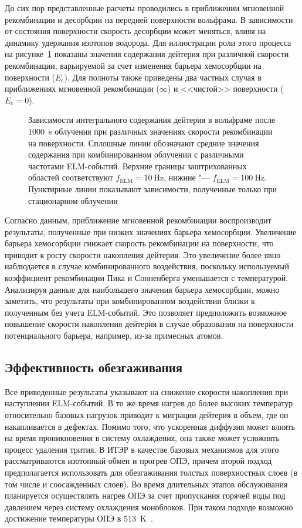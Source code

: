 До сих пор представленные расчеты проводились в приближении мгновенной рекомбинации и десорбции на передней поверхности вольфрама. В зависимости от состояния поверхности скорость десорбции может меняться, влияя на динамику удержания изотопов водорода. Для иллюстрации роли этого процесса на рисунке~\cref{fig:ch3/rec_var} показаны значения содержания дейтерия при различной скорости рекомбинации, варьируемой за счет изменения барьера хемосорбции на поверхности ($E_{\mathrm{c}}$). Для полноты также приведены два частных случая в приближениях мгновенной рекомбинации ($\infty$) и <<чистой>> поверхности ($E_{\mathrm{c}}=0$).

\begin{figure}[ht]
	\caption{Зависимости интегрального содержания дейтерия в вольфраме после \SI{1000}{\second} облучения при различных значениях скорости рекомбинации на поверхности. Сплошные линии обозначают средние значения содержания при комбинированном облучении с различными частотами ELM-событий. Верхние границы заштрихованных областей соответствуют \(f_\mathrm{ELM} = \SI{10}{\hertz}\), нижние "--- \(f_\mathrm{ELM} = \SI{100}{\hertz}\). Пунктирные линии показывают зависимости, полученные только при стационарном облучении}\label{fig:ch3/rec_var}
\end{figure}

Согласно данным, приближение мгновенной рекомбинации воспроизводит результаты, полученные при низких значениях барьера хемосорбции. Увеличение барьера хемосорбции снижает скорость рекомбинации на поверхности, что приводит к росту скорости накопления дейтерия. Это увеличение более явно наблюдается в случае комбинированного воздействия, поскольку используемый коэффициент рекомбинации Пика и Сонненберга уменьшается с температурой. Анализируя данные для наибольшего значения барьера хемосорбции, можно заметить, что результаты при комбинированном воздействии близки к полученным без учета ELM-событий. Это позволяет предположить возможное повышение скорости накопления дейтерия в случае образования на поверхности потенциального барьера, например, из-за примесных атомов.

\subsection{Эффективность обезгаживания}

Все приведенные результаты указывают на снижение скорости накопления при наступлении ELM-событий. В то же время нагрев до более высоких температур относительно базовых нагрузок приводит к миграции дейтерия в объем, где он накапливается в дефектах. Помимо того, что ускоренная диффузия может влиять на время проникновения в систему охлаждения, она также может усложнять процесс удаления трития. В ИТЭР в качестве базовых механизмов для этого рассматриваются изотопный обмен и прогрев ОПЭ, причем второй подход предполагается использовать для обезгаживания толстых поверхностных слоев (в том числе и соосажденных слоев). Во время длительных этапов обслуживания планируется осуществлять нагрев ОПЭ за счет пропускания горячей воды под давлением через систему охлаждения моноблоков. При таком подходе возможно достижение температуры ОПЭ в \SI{513}{\kelvin}~\cite{Pitts2025}.

